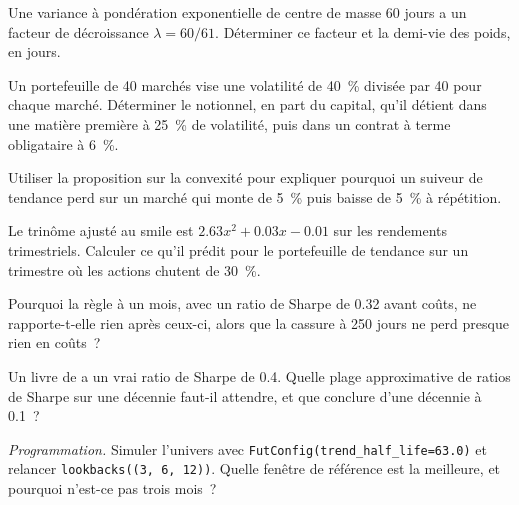\begin{exercise}[$\star$]\label{exo:s1:trend-following:1}
Une variance à pondération exponentielle de centre de masse 60 jours a un facteur de décroissance $\lambda = 60/61$. Déterminer ce facteur et
la demi-vie des poids, en jours.
\end{exercise}

\begin{exercise}[$\star$]\label{exo:s1:trend-following:2}
Un portefeuille de 40 marchés vise une volatilité de 40~\% divisée par 40 pour chaque marché. Déterminer le notionnel, en part du capital, qu'il détient
dans une matière première à 25~\% de volatilité, puis dans un contrat à terme obligataire à 6~\%.
\end{exercise}

\begin{exercise}[$\star$]\label{exo:s1:trend-following:3}
Utiliser la proposition sur la convexité pour expliquer pourquoi un suiveur de tendance perd sur un marché qui monte de 5~\% puis baisse de 5~\% à répétition.
\end{exercise}

\begin{exercise}[$\star\star$]\label{exo:s1:trend-following:4}
Le trinôme ajusté au smile est $2.63x^2 + 0.03x - 0.01$ sur les rendements trimestriels. Calculer ce qu'il prédit pour le portefeuille de
tendance sur un trimestre où les actions chutent de 30~\%.
\end{exercise}

\begin{exercise}[$\star\star$]\label{exo:s1:trend-following:5}
Pourquoi la règle à un mois, avec un ratio de Sharpe de 0.32 avant coûts, ne rapporte-t-elle rien après ceux-ci, alors que la cassure à 250 jours ne perd presque rien en coûts~?
\end{exercise}

\begin{exercise}[$\star\star$]\label{exo:s1:trend-following:6}
Un livre de  a un vrai ratio de Sharpe de 0.4. Quelle plage approximative de ratios de Sharpe sur une décennie faut-il attendre, et que conclure d'une décennie à 0.1~?
\end{exercise}

\begin{exercise}[$\star\star\star$]\label{exo:s1:trend-following:7}
\emph{Programmation.} Simuler l'univers avec \texttt{FutConfig(trend\_half\_life=63.0)} et relancer \texttt{lookbacks((3, 6, 12))}. Quelle fenêtre de référence
est la meilleure, et pourquoi n'est-ce pas trois mois~?
\end{exercise}

